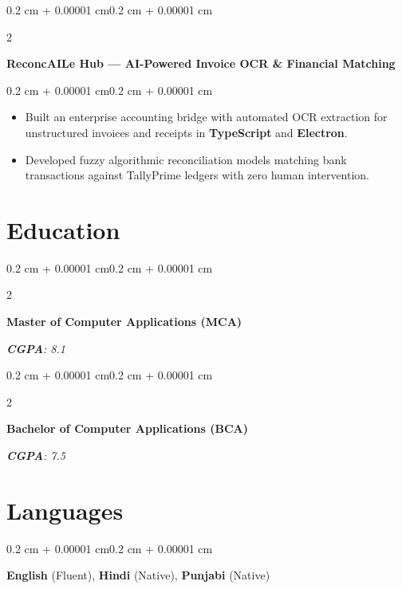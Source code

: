 \documentclass[10pt, a4paper]{article}
\newenvironment{highlights}{
    \begin{itemize}[
        topsep=0.06 cm,
        parsep=0.05 cm,
        partopsep=0pt,
        itemsep=0pt,
        leftmargin=0.4 cm + 10pt
    ]
}{
    \end{itemize}
}
\newenvironment{onecolentry}{
    \begin{adjustwidth}{0.2 cm + 0.00001 cm}{0.2 cm + 0.00001 cm}
}{
    \end{adjustwidth}
}
\newenvironment{twocolentry}[2][]{
    \onecolentry
    \def\secondColumn{#2}
    \setcolumnwidth{\fill, 4.5 cm}
    \begin{paracol}{2}
}{
    \switchcolumn \raggedleft \secondColumn
    \end{paracol}
    \endonecolentry
}
\let\hrefWithoutArrow\href
\renewcommand{\href}[2]{\hrefWithoutArrow{#1}{\ifthenelse{\equal{#2}{}}{ }{#2 }\raisebox{.15ex}{\footnotesize \faExternalLink*}}}
\begin{document}
\begin{twocolentry}{\textit{\href{https://github.com/I-am-Manu-Singh/reconcAIle-Hub}{\underline{Repo}}}}
    \textbf{ReconcAILe Hub — AI-Powered Invoice OCR \& Financial Matching}
\end{twocolentry}
\vspace{0.06 cm}
\begin{onecolentry}
    \begin{highlights}
    \item Built an enterprise accounting bridge with automated OCR extraction for unstructured invoices and receipts in \textbf{TypeScript} and \textbf{Electron}.
    \item Developed fuzzy algorithmic reconciliation models matching bank transactions against TallyPrime ledgers with zero human intervention.
    \end{highlights}
\end{onecolentry}

\section{Education}
\begin{twocolentry}{\textit{\textbf{CGPA}: 8.1}}
    \textbf{Master of Computer Applications (MCA)} 
\end{twocolentry}
\vspace{0.04 cm}
\begin{twocolentry}{\textit{\textbf{CGPA}: 7.5}}
    \textbf{Bachelor of Computer Applications (BCA)} 
\end{twocolentry}

\section{Languages}
\begin{onecolentry}
\textbf{English} (Fluent), \textbf{Hindi} (Native), \textbf{Punjabi} (Native)
\end{onecolentry}
\end{document}
